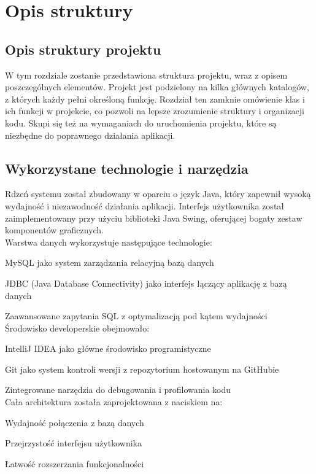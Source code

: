 \chapter{Opis struktury}
\label{chap:struk}

\section{Opis struktury projektu}
W tym rozdziale zostanie przedstawiona struktura projektu, wraz z opisem poszczególnych elementów. Projekt jest podzielony na kilka głównych katalogów, z których każdy pełni określoną funkcję.
Rozdział ten zamknie omówienie klas i ich funkcji w projekcie, co pozwoli na lepsze zrozumienie struktury i organizacji kodu. Skupi się też na wymaganiach do uruchomienia projektu, które są niezbędne do poprawnego działania aplikacji.

\section{Wykorzystane technologie i narzędzia}
Rdzeń systemu został zbudowany w oparciu o język Java, który zapewnił wysoką wydajność i niezawodność działania aplikacji. Interfejs użytkownika został zaimplementowany przy użyciu biblioteki Java Swing, oferującej bogaty zestaw komponentów graficznych.\\

Warstwa danych wykorzystuje następujące technologie:

MySQL jako system zarządzania relacyjną bazą danych

JDBC (Java Database Connectivity) jako interfejs łączący aplikację z bazą danych

Zaawansowane zapytania SQL z optymalizacją pod kątem wydajności\\

Środowisko developerskie obejmowało:

IntelliJ IDEA jako główne środowisko programistyczne

Git jako system kontroli wersji z repozytorium hostowanym na GitHubie

Zintegrowane narzędzia do debugowania i profilowania kodu\\

Cała architektura została zaprojektowana z naciskiem na:

Wydajność połączenia z bazą danych

Przejrzystość interfejsu użytkownika

Łatwość rozszerzania funkcjonalności


